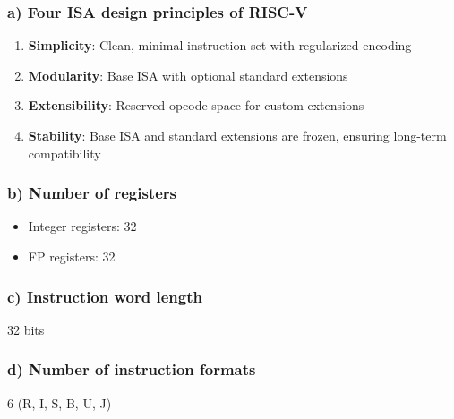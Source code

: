 \documentclass[12pt]{article}
\begin{document}
\subsubsection*{a) Four ISA design principles of RISC-V}
\begin{enumerate}
    \item \textbf{Simplicity}: Clean, minimal instruction set with regularized encoding
    \item \textbf{Modularity}: Base ISA with optional standard extensions
    \item \textbf{Extensibility}: Reserved opcode space for custom extensions
    \item \textbf{Stability}: Base ISA and standard extensions are frozen, ensuring long-term compatibility
\end{enumerate}

\subsubsection*{b) Number of registers}
\begin{itemize}
    \item Integer registers: 32
    \item FP registers: 32
\end{itemize}

\subsubsection*{c) Instruction word length}
32 bits

\subsubsection*{d) Number of instruction formats}
6 (R, I, S, B, U, J)
\end{document}
